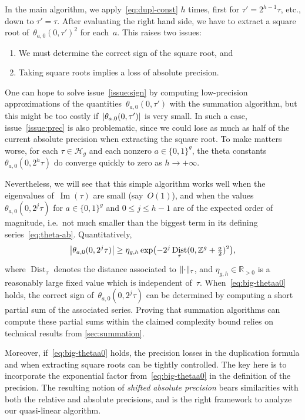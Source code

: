 \documentclass[12pt,oneside]{amsart}
\numberwithin{equation}{section}
\theoremstyle{definition}
\newcommand{\Z}{\mathbb{Z}}
\newcommand{\R}{\mathbb{R}}
\newcommand{\Half}{\mathcal{H}}
\DeclareMathOperator{\im}{Im}
\DeclareMathOperator{\Dist}{Dist}
\DeclarePairedDelimiter{\abs}{|}{|}
\DeclarePairedDelimiter{\paren}{(}{)}
\DeclarePairedDelimiter{\norm}{\|}{\|}
\begin{document}
In the main algorithm, we apply~\eqref{eq:dupl-const} $h$ times, first for
$\tau' = 2^{h-1}\tau$, etc., down to $\tau' = \tau$.  After evaluating the
right hand side, we have to extract a square root of~$\theta_{a,0}(0,\tau')^2$
for each~$a$. This raises two issues:
\begin{enumerate}
\item \label{issue:sign} We must determine the correct sign of the square root,
  and
\item \label{issue:prec} Taking square roots implies a loss of absolute
  precision.
\end{enumerate}


One can hope to solve issue~\eqref{issue:sign} by computing low-precision
approximations of the quantities~$\theta_{a,0}(0,\tau')$ with the summation
algorithm, but this might be too costly if~$\abs{\theta_{a,0}(0,\tau')}$ is
very small. In such a case, issue~\eqref{issue:prec} is also problematic, since
we could lose as much as half of the current absolute precision when extracting
the square root. To make matters worse, for each $\tau\in \Half_g$ and each
nonzero $a\in \{0,1\}^g$, the theta constants $\theta_{a,0}(0,2^h\tau)$ do
converge quickly to zero as $h\to +\infty$.

Nevertheless, we will see that this simple algorithm works well when the
eigenvalues of~$\im(\tau)$ are small (say~$O(1)$), and when the values
$\theta_{a,0}(0,2^j\tau)$ for $a\in \{0,1\}^g$ and $0\leq j\leq h-1$ are of the
expected order of magnitude, i.e.~not much smaller than the biggest term in its
defining series~\eqref{eq:theta-ab}. Quantitatively,
\begin{equation}
  \label{eq:big-thetaa0}
  \abs[\big]{\theta_{a,0}(0,2^j\tau)} \geq \eta_{g,h} \exp\paren[\big]{-2^j \Dist_{\tau}(0, \Z^g + \tfrac a2)^2},
\end{equation}
where $\Dist_\tau$ denotes the distance associated to $\norm{\cdot}_\tau$, and
$\eta_{g,h} \in \R_{>0}$ is a reasonably large fixed value which is independent
of~$\tau$. When~\eqref{eq:big-thetaa0} holds, the correct sign
of~$\theta_{a,0}(0,2^j\tau)$ can be determined by computing a short partial sum
of the associated series. Proving that summation algorithms can compute these
partial sums within the claimed complexity bound relies on technical results
from \cref{sec:summation}.

Moreover, if~\eqref{eq:big-thetaa0} holds, the precision losses in the
duplication formula and when extracting square roots can be tightly
controlled. The key here is to incorporate the exponential factor
from~\eqref{eq:big-thetaa0} in the definition of the precision. The resulting
notion of \emph{shifted absolute precision} bears similarities with both the
relative and absolute precisions, and is the right framework to analyze our
quasi-linear algorithm.
\end{document}
